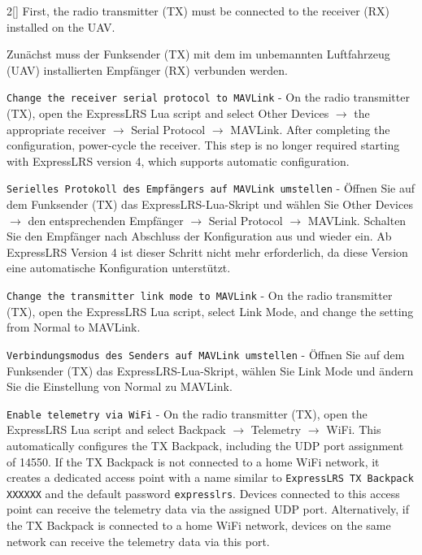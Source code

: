 \begin{paracol}{2}[]
First, the radio transmitter (TX) must be connected to the receiver (RX) installed on the UAV.

\colger

Zunächst muss der Funksender (TX) mit dem im unbemannten Luftfahrzeug (UAV) installierten Empfänger (RX) verbunden werden.

\coleng

\texttt{Change the receiver serial protocol to MAVLink} - On the radio transmitter (TX), open the ExpressLRS Lua script and select Other Devices $\longrightarrow$ the appropriate receiver $\longrightarrow$ Serial Protocol $\longrightarrow$ MAVLink. After completing the configuration, power-cycle the receiver. This step is no longer required starting with ExpressLRS version 4, which supports automatic configuration.

\colger

\texttt{Serielles Protokoll des Empfängers auf MAVLink umstellen} - Öffnen Sie auf dem Funksender (TX) das ExpressLRS-Lua-Skript und wählen Sie Other Devices $\longrightarrow$ den entsprechenden Empfänger $\longrightarrow$ Serial Protocol $\longrightarrow$ MAVLink. Schalten Sie den Empfänger nach Abschluss der Konfiguration aus und wieder ein. Ab ExpressLRS Version 4 ist dieser Schritt nicht mehr erforderlich, da diese Version eine automatische Konfiguration unterstützt.

\coleng

\texttt{Change the transmitter link mode to MAVLink} - On the radio transmitter (TX), open the ExpressLRS Lua script, select Link Mode, and change the setting from Normal to MAVLink.

\colger

\texttt{Verbindungsmodus des Senders auf MAVLink umstellen} - Öffnen Sie auf dem Funksender (TX) das ExpressLRS-Lua-Skript, wählen Sie Link Mode und ändern Sie die Einstellung von Normal zu MAVLink.

\coleng

\texttt{Enable telemetry via WiFi} - On the radio transmitter (TX), open the ExpressLRS Lua script and select Backpack $\longrightarrow$ Telemetry $\longrightarrow$ WiFi. This automatically configures the TX Backpack, including the UDP port assignment of 14550. If the TX Backpack is not connected to a home WiFi network, it creates a dedicated access point with a name similar to \verb!ExpressLRS TX Backpack XXXXXX! and the default password \verb!expresslrs!. Devices connected to this access point can receive the telemetry data via the assigned UDP port. Alternatively, if the TX Backpack is connected to a home WiFi network, devices on the same network can receive the telemetry data via this port.


\end{paracol}
